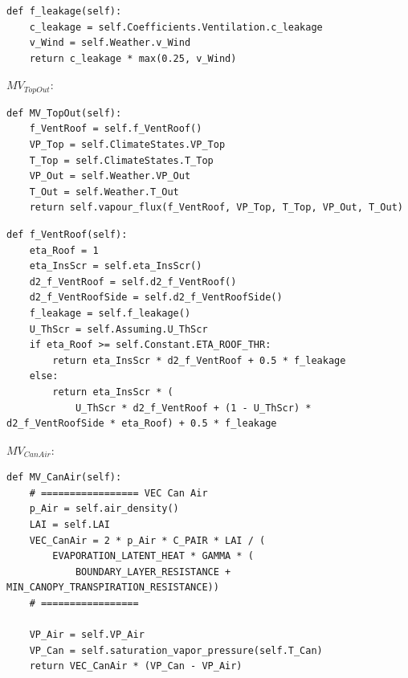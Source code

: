 \documentclass[a4paper]{article}
\numberwithin{equation}{section}
\begin{document}
\begin{mdframed}[leftline=false,rightline=false,backgroundcolor=magenta!10,nobreak=true]
  \begin{verbatim}
def f_leakage(self):
    c_leakage = self.Coefficients.Ventilation.c_leakage
    v_Wind = self.Weather.v_Wind
    return c_leakage * max(0.25, v_Wind)
  \end{verbatim}
\end{mdframed}

\(MV_{TopOut}\):
\begin{mdframed}[leftline=false,rightline=false,backgroundcolor=magenta!10,nobreak=true]
  \begin{verbatim}
def MV_TopOut(self):
    f_VentRoof = self.f_VentRoof()
    VP_Top = self.ClimateStates.VP_Top
    T_Top = self.ClimateStates.T_Top
    VP_Out = self.Weather.VP_Out
    T_Out = self.Weather.T_Out
    return self.vapour_flux(f_VentRoof, VP_Top, T_Top, VP_Out, T_Out)
  \end{verbatim}
\end{mdframed}
\begin{mdframed}[leftline=false,rightline=false,backgroundcolor=magenta!10,nobreak=true]
  \begin{verbatim}
def f_VentRoof(self):
    eta_Roof = 1
    eta_InsScr = self.eta_InsScr()
    d2_f_VentRoof = self.d2_f_VentRoof()
    d2_f_VentRoofSide = self.d2_f_VentRoofSide()
    f_leakage = self.f_leakage()
    U_ThScr = self.Assuming.U_ThScr
    if eta_Roof >= self.Constant.ETA_ROOF_THR:
        return eta_InsScr * d2_f_VentRoof + 0.5 * f_leakage
    else:
        return eta_InsScr * (
            U_ThScr * d2_f_VentRoof + (1 - U_ThScr) * d2_f_VentRoofSide * eta_Roof) + 0.5 * f_leakage
  \end{verbatim}
\end{mdframed}

\(MV_{CanAir}\):
\begin{mdframed}[leftline=false,rightline=false,backgroundcolor=magenta!10,nobreak=true]
  \begin{verbatim}
def MV_CanAir(self):
    # ================= VEC Can Air
    p_Air = self.air_density()
    LAI = self.LAI
    VEC_CanAir = 2 * p_Air * C_PAIR * LAI / (
        EVAPORATION_LATENT_HEAT * GAMMA * (
            BOUNDARY_LAYER_RESISTANCE + MIN_CANOPY_TRANSPIRATION_RESISTANCE))
    # =================

    VP_Air = self.VP_Air
    VP_Can = self.saturation_vapor_pressure(self.T_Can)
    return VEC_CanAir * (VP_Can - VP_Air)
  \end{verbatim}
\end{mdframed}
\end{document}
